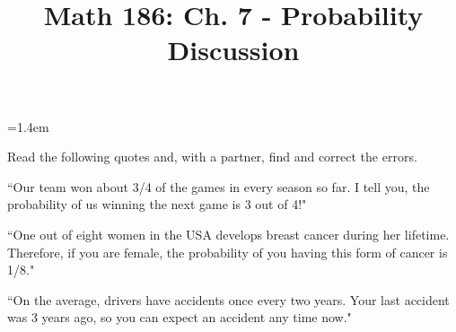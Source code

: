 \documentclass[12pt]{amsart}
\title{Math 186: Ch. 7 - Probability Discussion}
\begin{document}
\maketitle



\begin{list}
{}
{\leftmargin=1.4em}


\item[ ] Read the following quotes and, with a partner, find and correct the errors.\\ 

\item ``Our team won about 3/4 of the games in every season so far.  I tell you, the probability of us winning the next game is 3 out of 4!"

\vspace{2in}

\item ``One out of eight women in the USA develops breast cancer during her lifetime.  Therefore, if you are female, the probability of you having this form of cancer is 1/8."

\vspace{2in}

\item ``On the average, drivers have accidents once every two years.  Your last accident was 3 years ago, so you can expect an accident any time now."

\end{list}
\end{document}
